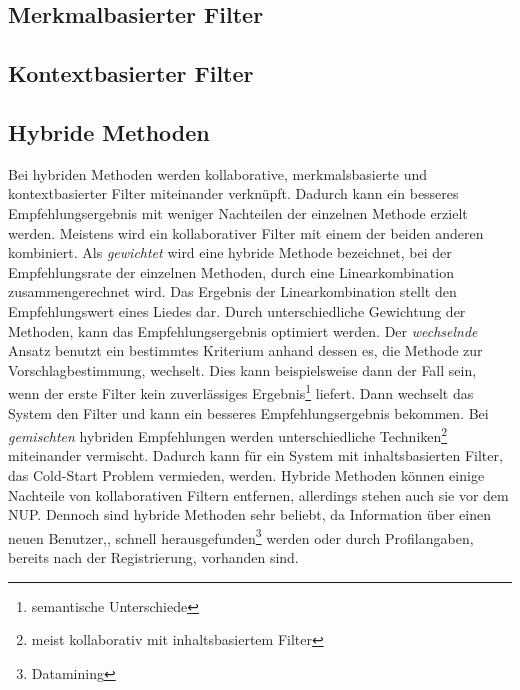 \documentclass[twosided,a4,10pt]{article}
\begin{document}
\begin{multicols}{2}
		\subsection{Merkmalbasierter Filter}
		\subsection{Kontextbasierter Filter}				
		\subsection{Hybride Methoden}
		Bei hybriden Methoden werden kollaborative, merkmalsbasierte und kontextbasierter Filter miteinander verknüpft. Dadurch kann ein besseres Empfehlungsergebnis mit weniger Nachteilen der einzelnen Methode erzielt werden. Meistens wird ein kollaborativer Filter mit einem der beiden anderen kombiniert.\newline
		Als \textit{gewichtet} wird eine hybride Methode bezeichnet, bei der Empfehlungsrate der einzelnen Methoden, durch eine Linearkombination zusammengerechnet wird. Das Ergebnis der Linearkombination stellt den Empfehlungswert eines Liedes dar. Durch unterschiedliche Gewichtung der Methoden, kann das Empfehlungsergebnis optimiert werden. Der \textit{wechselnde} Ansatz benutzt ein bestimmtes Kriterium anhand dessen es, die Methode zur Vorschlagbestimmung, wechselt. Dies kann beispielsweise dann der Fall sein, wenn der erste Filter kein zuverlässiges Ergebnis\footnote[6]{semantische Unterschiede} liefert. Dann wechselt das System den Filter und kann ein besseres Empfehlungsergebnis bekommen. Bei \textit{gemischten} hybriden Empfehlungen werden unterschiedliche Techniken\footnote[7]{meist kollaborativ mit inhaltsbasiertem Filter} miteinander vermischt. Dadurch kann für ein System mit inhaltsbasierten Filter, das Cold-Start Problem vermieden, werden.\newline
		Hybride Methoden können einige Nachteile von kollaborativen Filtern entfernen, allerdings stehen auch sie vor dem NUP. Dennoch sind hybride Methoden sehr beliebt, da Information über einen neuen Benutzer,, schnell herausgefunden\footnote[8]{Datamining} werden oder durch Profilangaben, bereits nach der Registrierung, vorhanden sind. \cite{burke}

\end{multicols}
\end{document}
